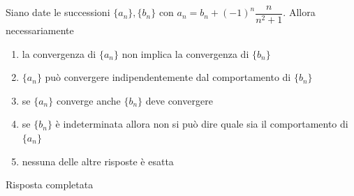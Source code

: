 \begin{quiz}
Siano date le successioni $\{a_n\},\{b_n\}$ con $a_n=b_n+(-1)^n\dfrac{n}{n^2+1}$. Allora necessariamente
\begin{enumerate}
\item la convergenza di $\{a_n\}$ non implica la convergenza di $\{b_n\}$
\item $\{a_n\}$ pu\`o convergere indipendentemente dal comportamento di $\{b_n\}$
\item se $\{a_n\}$ converge anche $\{b_n\}$ deve convergere
\item se $\{b_n\}$ \`e indeterminata allora non si pu\`o dire quale sia il comportamento di $\{a_n\}$
\item nessuna delle altre risposte \`e esatta
\end{enumerate}
\end{quiz}
Risposta completata





